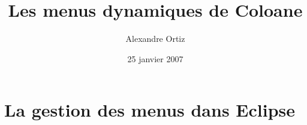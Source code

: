 \documentclass{article}
\title{Les menus dynamiques de Coloane}
\date{25 janvier 2007}
\author{Alexandre Ortiz}
\begin{document}
\maketitle

\section{La gestion des menus dans Eclipse}
\par
\end{document}
